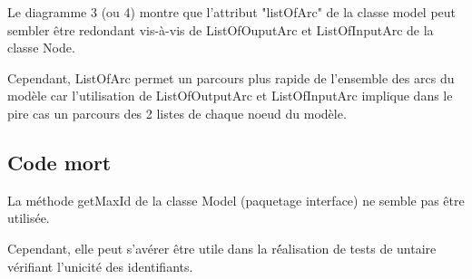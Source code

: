 \documentclass{article}
\begin{document}
Le diagramme 3 (ou 4) montre que l'attribut "listOfArc" de la classe model peut sembler \^etre redondant vis-\`a-vis de ListOfOuputArc et ListOfInputArc de la classe Node.

Cependant, ListOfArc permet un parcours plus rapide de l'ensemble des arcs du mod\`ele car l'utilisation de ListOfOutputArc et ListOfInputArc implique dans le pire cas un parcours des 2 listes de chaque noeud du mod\`ele.

\subsection{Code mort}

La m\'ethode getMaxId de la classe Model (paquetage interface) ne semble pas \^etre utilis\'ee.

Cependant, elle peut s'av\'erer \^etre utile dans la r\'éalisation de tests de untaire v\'erifiant l'unicit\'e des identifiants.
\end{document}

